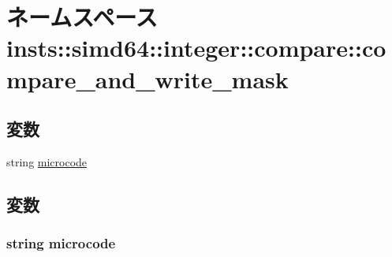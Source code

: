 \hypertarget{namespaceinsts_1_1simd64_1_1integer_1_1compare_1_1compare__and__write__mask}{
\section{ネームスペース insts::simd64::integer::compare::compare\_\-and\_\-write\_\-mask}
\label{namespaceinsts_1_1simd64_1_1integer_1_1compare_1_1compare__and__write__mask}
}
\subsection*{変数}
\begin{DoxyCompactItemize}
\item 
string \hyperlink{namespaceinsts_1_1simd64_1_1integer_1_1compare_1_1compare__and__write__mask_a770f11a173e99389a8802f0107ed8f52}{microcode}
\end{DoxyCompactItemize}


\subsection{変数}
\hypertarget{namespaceinsts_1_1simd64_1_1integer_1_1compare_1_1compare__and__write__mask_a770f11a173e99389a8802f0107ed8f52}{
\subsubsection[{microcode}]{\setlength{\rightskip}{0pt plus 5cm}string {\bf microcode}}}
\label{namespaceinsts_1_1simd64_1_1integer_1_1compare_1_1compare__and__write__mask_a770f11a173e99389a8802f0107ed8f52}
